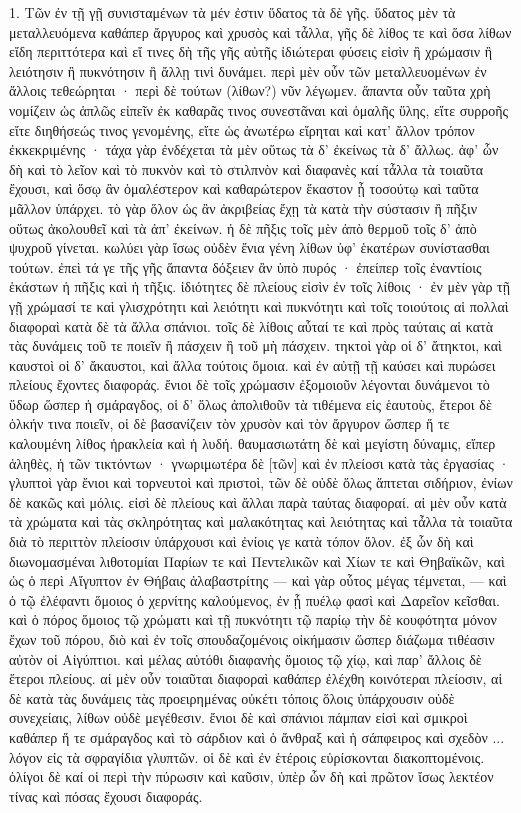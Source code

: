 \documentclass[a4paper, 11pt, oneside, polutonikogreek, german]{article}
\begin{document}
\setlength{\parskip}{1mm plus1mm minus1mm}
\clearpage
1. Τῶν ἐν τῇ γῇ συνισταμένων τὰ μέν ἐστιν ὕδατος τὰ δὲ γῆς. ὕδατος μὲν τὰ μεταλλευόμενα καθάπερ ἄργυρος καὶ χρυσὸς καὶ τἆλλα, γῆς δὲ λίθος τε καὶ ὅσα λίθων εἴδη περιττότερα καὶ εἴ τινες δὴ τῆς γῆς αὐτῆς ἰδιώτεραι φύσεις εἰσὶν ἢ χρώμασιν ἢ λειότησιν ἢ πυκνότησιν ἢ ἄλλῃ τινὶ δυνάμει. περὶ μὲν οὖν τῶν μεταλλευομένων ἐν ἄλλοις τεθεώρηται · περὶ δὲ τούτων (λίθων?) νῦν λέγωμεν. ἅπαντα οὖν ταῦτα χρὴ νομίζειν ὡς ἁπλῶς εἰπεῖν ἐκ καθαρᾶς τινος συνεστᾶναι καὶ ὁμαλῆς ὕλης, εἴτε συρροῆς εἴτε διηθήσεώς τινος γενομένης, εἴτε ὡς ἀνωτέρω εἴρηται καὶ κατ' ἄλλον τρόπον ἐκκεκριμένης · τάχα γὰρ ἐνδέχεται τὰ μὲν οὕτως τὰ δ' ἐκείνως τὰ δ' ἄλλως. ἀφ' ὧν δὴ καὶ τὸ λεῖον καὶ τὸ πυκνὸν καὶ τὸ στιλπνὸν καὶ διαφανὲς καί τἆλλα τὰ τοιαῦτα ἔχουσι, καὶ ὅσῳ ἂν ὁμαλέστερον καὶ καθαρώτερον ἕκαστον ᾖ τοσούτῳ καὶ ταῦτα μᾶλλον ὑπάρχει. τὸ γὰρ ὅλον ὡς ἂν ἀκριβείας ἔχῃ τὰ κατὰ τὴν σύστασιν ἢ πῆξιν οὕτως ἀκολουθεῖ καὶ τὰ ἀπ' ἐκείνων. ἡ δὲ πῆξις τοῖς μὲν ἀπὸ θερμοῦ τοῖς δ' ἀπὸ ψυχροῦ γίνεται. κωλύει γὰρ ἴσως οὐδὲν ἔνια γένη λίθων ὑφ' ἑκατέρων συνίστασθαι τούτων. ἐπεὶ τά γε τῆς γῆς ἅπαντα δόξειεν ἂν ὑπὸ πυρός · ἐπείπερ τοῖς ἐναντίοις ἑκάστων ἡ πῆξις καὶ ἡ τῆξις. ἰδιότητες δὲ πλείους εἰσὶν ἐν τοῖς λίθοις · ἐν μὲν γὰρ τῇ γῇ χρώμασί τε καὶ γλισχρότητι καὶ λειότητι καὶ πυκνότητι καὶ τοῖς τοιούτοις αἱ πολλαὶ διαφοραὶ κατὰ δὲ τὰ ἄλλα σπάνιοι. τοῖς δὲ λίθοις αὗταί τε καὶ πρὸς ταύταις αἱ κατὰ τὰς δυνάμεις τοῦ τε ποιεῖν ἢ πάσχειν ἢ τοῦ μὴ πάσχειν. τηκτοὶ γὰρ οἱ δ' ἄτηκτοι, καὶ καυστοὶ οἱ δ' ἄκαυστοι, καὶ ἄλλα τούτοις ὅμοια. καὶ ἐν αὐτῇ τῇ καύσει καὶ πυρώσει πλείους ἔχοντες διαφοράς. ἔνιοι δὲ τοῖς χρώμασιν ἐξομοιοῦν λέγονται δυνάμενοι τὸ ὕδωρ ὥσπερ ἡ σμάραγδος, οἱ δ' ὅλως ἀπολιθοῦν τὰ τιθέμενα εἰς ἑαυτοὺς, ἕτεροι δὲ ὁλκήν τινα ποιεῖν, οἱ δὲ βασανίζειν τὸν χρυσὸν καὶ τὸν ἄργυρον ὥσπερ ἥ τε καλουμένη λίθος ἡρακλεία καὶ ἡ λυδή. θαυμασιωτάτη δὲ καὶ μεγίστη δύναμις, εἴπερ ἀληθὲς, ἡ τῶν τικτόντων · γνωριμωτέρα δὲ [τῶν] καὶ ἐν πλείοσι κατὰ τὰς ἐργασίας · γλυπτοὶ γὰρ ἔνιοι καὶ τορνευτοὶ καὶ πριστοὶ, τῶν δὲ οὐδὲ ὅλως ἅπτεται σιδήριον, ἐνίων δὲ κακῶς καὶ μόλις. εἰσὶ δὲ πλείους καὶ ἄλλαι παρὰ ταύτας διαφοραί. αἱ μὲν οὖν κατὰ τὰ χρώματα καὶ τὰς σκληρότητας καὶ μαλακότητας καὶ λειότητας καὶ τἆλλα τὰ τοιαῦτα διὰ τὸ περιττὸν πλείοσιν ὑπάρχουσι καὶ ἐνίοις γε κατὰ τόπον ὅλον. ἐξ ὧν δὴ καὶ διωνομασμέναι λιθοτομίαι Παρίων τε καὶ Πεντελικῶν καὶ Χίων τε καὶ Θηβαϊκῶν, καὶ ὡς ὁ περὶ Αἴγυπτον ἐν Θήβαις ἀλαβαστρίτης --- καὶ γὰρ οὗτος μέγας τέμνεται, --- καὶ ὁ τῷ ἐλέφαντι ὅμοιος ὁ χερνίτης καλούμενος, ἐν ᾗ πυέλῳ φασὶ καὶ Δαρεῖον κεῖσθαι. καὶ ὁ πόρος ὅμοιος τῷ χρώματι καὶ τῇ πυκνότητι τῷ παρίῳ τὴν δὲ κουφότητα μόνον ἔχων τοῦ πόρου, διὸ καὶ ἐν τοῖς σπουδαζομένοις οἰκήμασιν ὥσπερ διάζωμα τιθέασιν αὐτὸν οἱ Αἰγύπτιοι. καὶ μέλας αὐτόθι διαφανὴς ὅμοιος τῷ χίῳ, καὶ παρ' ἄλλοις δὲ ἕτεροι πλείους. αἱ μὲν οὖν τοιαῦται διαφοραὶ καθάπερ ἐλέχθη κοινότεραι πλείοσιν, αἱ δὲ κατὰ τὰς δυνάμεις τὰς προειρημένας οὐκέτι τόποις ὅλοις ὑπάρχουσιν οὐδὲ συνεχείαις, λίθων οὐδὲ μεγέθεσιν. ἔνιοι δὲ καὶ σπάνιοι πάμπαν εἰσὶ καὶ σμικροὶ καθάπερ ἥ τε σμάραγδος καὶ τὸ σάρδιον καὶ ὁ ἄνθραξ καὶ ἡ σάπφειρος καὶ σχεδὸν ... λόγον εἰς τὰ σφραγίδια γλυπτῶν. οἱ δὲ καὶ ἐν ἑτέροις εὑρίσκονται διακοπτομένοις. ὀλίγοι δὲ καί οἱ περὶ τὴν πύρωσιν καὶ καῦσιν, ὑπὲρ ὧν δὴ καὶ πρῶτον ἴσως λεκτέον τίνας καὶ πόσας ἔχουσι διαφοράς.
\end{document}
